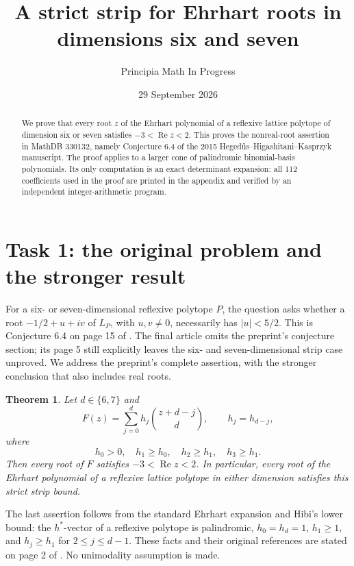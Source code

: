 \documentclass[11pt]{article}
\title{A strict strip for Ehrhart roots in dimensions six and seven}
\author{Principia Math In Progress}
\date{29 September 2026}
\newtheorem{theorem}{Theorem}
\newcommand{\Rea}{\operatorname{Re}}
\begin{document}
\maketitle
\begin{abstract}
We prove that every root $z$ of the Ehrhart polynomial of a reflexive
lattice polytope of dimension six or seven satisfies $-3<\Rea z<2$.
This proves the nonreal-root assertion in MathDB 330132, namely
Conjecture 6.4 of the 2015 Heged\H{u}s--Higashitani--Kasprzyk manuscript.
The proof applies to a larger cone of palindromic binomial-basis
polynomials. Its only computation is an exact determinant expansion:
all 112 coefficients used in the proof are printed in the appendix and
verified by an independent integer-arithmetic program.
\end{abstract}

\section*{Task 1: the original problem and the stronger result}
For a six- or seven-dimensional reflexive polytope $P$, the question asks
whether a root $-1/2+u+iv$ of $L_P$, with $u,v\ne0$, necessarily has
$|u|<5/2$. This is Conjecture 6.4 on page 15 of \cite{HHKpre}.
The final article \cite{HHK} omits the preprint's conjecture section;
its page 5 still explicitly leaves the six- and seven-dimensional strip
case unproved. We address the preprint's complete assertion, with the
stronger conclusion that also includes real roots.

\begin{theorem}\label{thm}
Let $d\in\{6,7\}$ and
\[
 F(z)=\sum_{j=0}^d h_j\binom{z+d-j}{d},\qquad h_j=h_{d-j},
\]
where
\[
 h_0>0,\quad h_1\ge h_0,\quad h_2\ge h_1,\quad h_3\ge h_1.
\]
Then every root of $F$ satisfies $-3<\Rea z<2$.
In particular, every root of the Ehrhart polynomial of a reflexive
lattice polytope in either dimension satisfies this strict strip bound.
\end{theorem}

The last assertion follows from the standard Ehrhart expansion and
Hibi's lower bound: the $h^*$-vector of a reflexive polytope is
palindromic, $h_0=h_d=1$, $h_1\ge1$, and $h_j\ge h_1$ for
$2\le j\le d-1$. These facts and their original references are stated
on page 2 of \cite{HHK}. No unimodality assumption is made.
\end{document}
